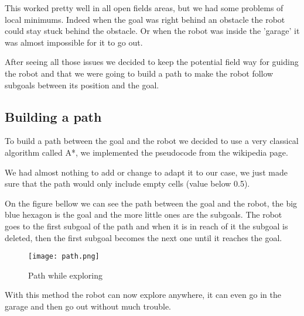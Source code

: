 This worked pretty well in all open fields areas, but we had some problems of local minimums.
Indeed when the goal was right behind an obstacle the robot could stay stuck behind the obstacle.
Or when the robot was inside the 'garage' it was almost impossible for it to go out.

After seeing all those issues we decided to keep the potential field way for guiding the robot and that we were going to build a path to make the robot follow subgoals between its position and the goal.

\subsection{Building a path}

To build a path between the goal and the robot we decided to use a very classical algorithm called A*, we implemented the pseudocode from the wikipedia page\cite{astar}.

We had almost nothing to add or change to adapt it to our case, we just made sure that the path would only include empty cells (value below 0.5).

On the figure bellow we can see the path between the goal and the robot, the big blue hexagon is the goal and the more little ones are the subgoals.
The robot goes to the first subgoal of the path and when it is in reach of it the subgoal is deleted, then the first subgoal becomes the next one until it reaches the goal.

\FloatBarrier
\begin{figure}[h]
    \centering\texttt{[image: path.png]}
    \label{fig:path}
    \caption{Path while exploring}
\end{figure}
\FloatBarrier

With this method the robot can now explore anywhere, it can even go in the garage and then go out without much trouble.
